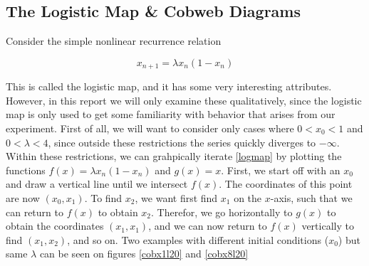 \documentclass[12pt,oneside,a4paper]{article}
\numberwithin{equation}{section}
\begin{document}
{{{{\subsection{The Logistic Map \& Cobweb Diagrams}

Consider the simple nonlinear recurrence relation


\begin{equation}
x_{n+1}=\lambda x_n (1-x_n)
\label{logmap}
\end{equation}


This is called the logistic map, and it has some very interesting attributes. However, in this report we 
will only examine these qualitatively, since the logistic map is only used to get some familiarity with 
behavior that arises from our experiment. First of all, we will want to consider only cases where 
$0<x_0<1$ and $0<\lambda<4$, since outside these restrictions the series quickly diverges to $-\infty$. 
Within these restrictions, we can grahpically iterate \eqref{logmap} by 
plotting the functions $f(x)=\lambda x_n (1-x_n)$ and $g(x)=x$. First, we start 
off with an $x_0$ and draw a vertical line until we intersect $f(x)$. The 
coordinates of this point are now $(x_0,x_1)$. To find $x_2$, we want first 
find $x_1$ on the $x$-axis, such that we can return to $f(x)$ to obtain $x_2$. 
Therefor, we go horizontally to $g(x)$ to obtain the coordinates $(x_1,x_1)$, and 
we can now return to $f(x)$ vertically to find $(x_1,x_2)$, and so on. Two examples with different initial conditions ($x_0$) but same $\lambda$ can be seen on figures \ref{cobx1l20} and \ref{cobx8l20}

}}}}
\end{document}
